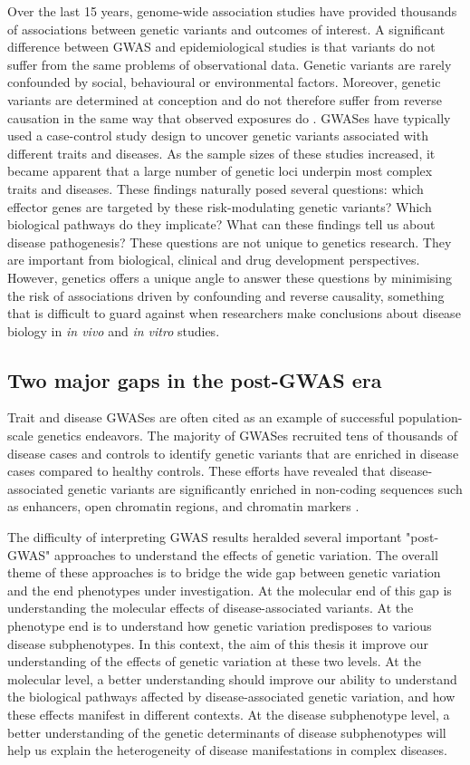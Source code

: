 Over the last 15 years, genome-wide association studies have provided thousands of associations between genetic variants and outcomes of interest. A significant difference between GWAS and epidemiological studies is that variants do not suffer from the same problems of observational data. Genetic variants are rarely confounded by social, behavioural or environmental factors. Moreover, genetic variants are determined at conception and do not therefore suffer from reverse causation in the same way that observed exposures do \cite{Smith2007-py}. GWASes have typically used a case-control study design to uncover genetic variants associated with different traits and diseases. As the sample sizes of these studies increased, it became apparent that a large number of genetic loci underpin most complex traits and diseases. These findings naturally posed several questions: which effector genes are targeted by these risk-modulating genetic variants? Which biological pathways do they implicate? What can these findings tell us about disease pathogenesis? These questions are not unique to genetics research. They are important from biological, clinical and drug development perspectives. However, genetics offers a unique angle to answer these questions by minimising the risk of associations driven by confounding and reverse causality, something that is difficult to guard against when researchers make conclusions about disease biology in \textit{in vivo} and \textit{in vitro} studies. 

\subsection{Two major gaps in the post-GWAS era}
Trait and disease GWASes are often cited as an example of successful population-scale genetics endeavors. The majority of GWASes recruited tens of thousands of disease cases and controls to identify genetic variants that are enriched in disease cases compared to healthy controls. These efforts have revealed that disease-associated genetic variants are significantly enriched in non-coding sequences such as enhancers, open chromatin regions, and chromatin markers \cite{Ahonen2009-eo,Degner2012-dq,Trynka2013-qs}. 

The difficulty of interpreting GWAS results heralded several important "post-GWAS" approaches to understand the effects of genetic variation. The overall theme of these approaches is to bridge the wide gap between genetic variation and the end phenotypes under investigation. At the molecular end of this gap is understanding the molecular effects of disease-associated variants. At the phenotype end is to understand how genetic variation predisposes to various disease subphenotypes. In this context, the aim of this thesis it improve our understanding of the effects of genetic variation at these two levels. At the molecular level, a better understanding should improve our ability to understand the biological pathways affected by disease-associated genetic variation, and how these effects manifest in different contexts. At the disease subphenotype level, a better understanding of the genetic determinants of disease subphenotypes will help us explain the heterogeneity of disease manifestations in complex diseases. 

